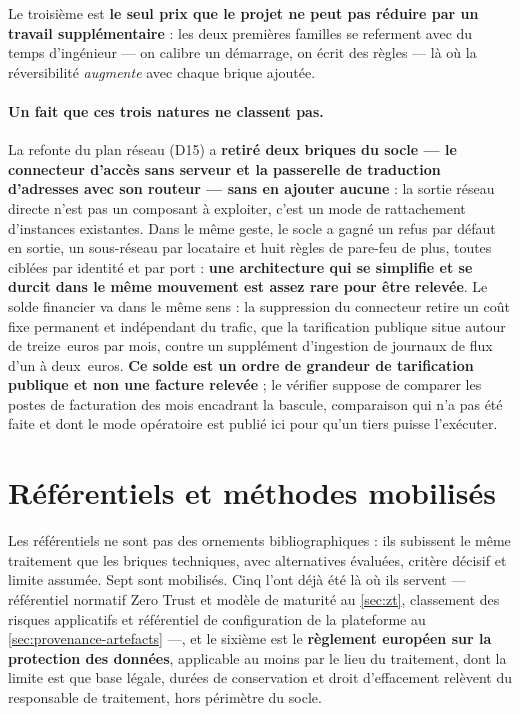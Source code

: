 Le troisième est \textbf{le seul prix que le projet ne peut pas réduire par un travail
supplémentaire} : les deux premières familles se referment avec du temps d'ingénieur --- on
calibre un démarrage, on écrit des règles --- là où la réversibilité \emph{augmente} avec chaque
brique ajoutée.

\paragraph{Un fait que ces trois natures ne classent pas.} La refonte du plan réseau (D15) a
\textbf{retiré deux briques du socle --- le connecteur d'accès sans serveur et la passerelle de
traduction d'adresses avec son routeur --- sans en ajouter aucune} : la sortie réseau directe
n'est pas un composant à exploiter, c'est un mode de rattachement d'instances existantes. Dans le
même geste, le socle a gagné un refus par défaut en sortie, un sous-réseau par locataire et huit
règles de pare-feu de plus, toutes ciblées par identité et par port : \textbf{une architecture qui
se simplifie et se durcit dans le même mouvement est assez rare pour être relevée}. Le solde
financier va dans le même sens : la suppression du connecteur retire un coût fixe permanent et
indépendant du trafic, que la tarification publique situe autour de treize~euros par mois, contre
un supplément d'ingestion de journaux de flux d'un à deux~euros. \textbf{Ce solde est un ordre de
grandeur de tarification publique et non une facture relevée} ; le vérifier suppose de comparer
les postes de facturation des mois encadrant la bascule, comparaison qui n'a pas été faite et
dont le mode opératoire est publié ici pour qu'un tiers puisse l'exécuter.

\section{Référentiels et méthodes mobilisés}
\label{sec:referentiels-methodes}

Les référentiels ne sont pas des ornements bibliographiques : ils subissent le même traitement que
les briques techniques, avec alternatives évaluées, critère décisif et limite assumée. Sept sont
mobilisés. Cinq l'ont déjà été là où ils servent --- référentiel normatif Zero Trust et modèle de
maturité au \cref{sec:zt}, classement des risques applicatifs et référentiel de configuration
de la plateforme au \cref{sec:provenance-artefacts} ---, et le sixième est le \textbf{règlement
européen sur la protection des données}, applicable au moins par le lieu du traitement, dont la
limite est que base légale, durées de conservation et droit d'effacement relèvent du responsable
de traitement, hors périmètre du socle.

